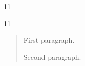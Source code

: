\documentclass[paper=A4]{ropas-poster}
\begin{document}
\begin{postergrid}{1}{1}
\begin{posterblock}{1}{1}
\begin{quotation}First paragraph.\par Second paragraph.\end{quotation}
\end{posterblock}
\end{postergrid}
\end{document}
